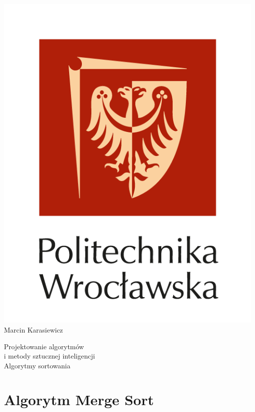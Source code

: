 \documentclass[13pt]{article}
\begin{document}
 
\begin{titlepage}
\begin{center}
\includegraphics[scale=1.0]{./Pwr_logo/logo_PWr_2.png}
\\
\vspace{1.5cm}
{\Huge Marcin Karasiewicz}
\\
\begin{Large}
\vspace{1.0cm}
Projektowanie algorytmów \\ i metody sztucznej inteligencji \\
\vspace{1.0cm}
Algorytmy sortowania
\end{Large}
\end{center}
\newpage
\tableofcontents 
\end{titlepage}
\newpage

\section{Algorytm Merge Sort }
\end{document}

